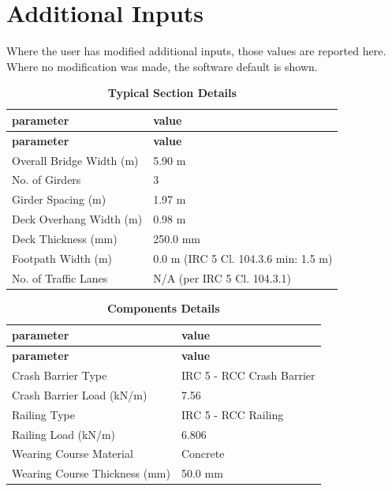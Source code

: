 \documentclass[12pt,a4paper]{report}
\numberwithin{table}{chapter}
\numberwithin{figure}{chapter}
\begin{document}
\newpage
\section{Additional Inputs}
\label{sec:additional-inputs}

Where the user has modified additional inputs, those values are reported here. Where no modification was made, the software default is shown.

\vspace{0.8cm}

\begin{longtable}{|L{5.5cm}|p{10.0cm}|}
\caption{\textbf{Typical Section Details}}\\
\hline
\textbf{parameter} & \textbf{value} \\
\hline
\endfirsthead

\hline
\textbf{parameter} & \textbf{value} \\
\hline
\endhead
\hline
\endlastfoot
\textnormal{Overall Bridge Width (m)} & 5.90 m \\[6pt]
\hline
\textnormal{No. of Girders} & 3 \\[6pt]
\hline
\textnormal{Girder Spacing (m)} & 1.97 m \\[6pt]
\hline
\textnormal{Deck Overhang Width (m)} & 0.98 m \\[6pt]
\hline
\textnormal{Deck Thickness (mm)} & 250.0 mm \\[6pt]
\hline
\textnormal{Footpath Width (m)} & 0.0 m (IRC 5 Cl. 104.3.6 min: 1.5 m) \\[6pt]
\hline
\textnormal{No. of Traffic Lanes} & N/A (per IRC 5 Cl. 104.3.1) \\[6pt]
\end{longtable}

\vspace{0.8em}

\begin{longtable}{|L{5.5cm}|p{10.0cm}|}
\caption{\textbf{Components Details}}\\
\hline
\textbf{parameter} & \textbf{value} \\
\hline
\endfirsthead

\hline
\textbf{parameter} & \textbf{value} \\
\hline
\endhead
\hline
\endlastfoot
\textnormal{Crash Barrier Type} & IRC 5 - RCC Crash Barrier \\[6pt]
\hline
\textnormal{Crash Barrier Load (kN/m)} & 7.56 \\[6pt]
\hline

\textnormal{Railing Type} & IRC 5 - RCC Railing \\[6pt]
\hline
\textnormal{Railing Load (kN/m)} & 6.806 \\[6pt]
\hline
\textnormal{Wearing Course Material} & Concrete \\[6pt]
\hline
\textnormal{Wearing Course Thickness (mm)} & 50.0 mm \\[6pt]
\end{longtable}
\end{document}

